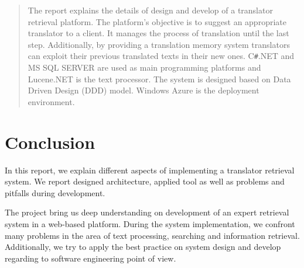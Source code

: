 \newcommand{\figurescaling}{0.7}





\maketitle
\begin{abstract}
The report explains the details of design and develop of a translator retrieval platform. The platform's objective is to suggest an appropriate translator to a client. It manages the process of translation until the last step. Additionally, by providing a translation memory system translators can exploit their previous translated texts in their new ones. C\texttt{\#}.NET and MS SQL SERVER are used as main programming platforms and Lucene.NET is the text processor. The system is designed based on Data Driven Design (DDD) model. Windows Azure is the deployment environment.
\end{abstract}

\vfill
\tableofcontents
\newpage







\section{Conclusion}
\label{sec:conclusion}
In this report, we explain different aspects of implementing a translator retrieval system. We report designed architecture, applied tool as well as problems and pitfalls during development.

The project bring us deep understanding on development of an expert retrieval system in a web-based platform. During the system implementation, we confront many problems in the area of text processing, searching and information retrieval. Additionally, we try to apply the best practice on system design and develop regarding to software engineering point of view.
\newpage

\listoffigures




